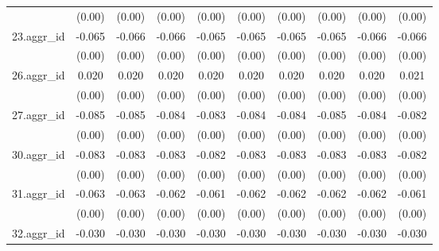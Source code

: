 {\begin{tabular}{l*{9}{c}}
          &   (0.00)         &   (0.00)         &   (0.00)         &   (0.00)         &   (0.00)         &   (0.00)         &   (0.00)         &   (0.00)         &   (0.00)         \\
[1em]
23.aggr\_id&   -0.065\sym{***}&   -0.066\sym{***}&   -0.066\sym{***}&   -0.065\sym{***}&   -0.065\sym{***}&   -0.065\sym{***}&   -0.065\sym{***}&   -0.066\sym{***}&   -0.066\sym{***}\\
          &   (0.00)         &   (0.00)         &   (0.00)         &   (0.00)         &   (0.00)         &   (0.00)         &   (0.00)         &   (0.00)         &   (0.00)         \\
[1em]
26.aggr\_id&    0.020\sym{***}&    0.020\sym{***}&    0.020\sym{***}&    0.020\sym{***}&    0.020\sym{***}&    0.020\sym{***}&    0.020\sym{***}&    0.020\sym{***}&    0.021\sym{***}\\
          &   (0.00)         &   (0.00)         &   (0.00)         &   (0.00)         &   (0.00)         &   (0.00)         &   (0.00)         &   (0.00)         &   (0.00)         \\
[1em]
27.aggr\_id&   -0.085\sym{***}&   -0.085\sym{***}&   -0.084\sym{***}&   -0.083\sym{***}&   -0.084\sym{***}&   -0.084\sym{***}&   -0.085\sym{***}&   -0.084\sym{***}&   -0.082\sym{***}\\
          &   (0.00)         &   (0.00)         &   (0.00)         &   (0.00)         &   (0.00)         &   (0.00)         &   (0.00)         &   (0.00)         &   (0.00)         \\
[1em]
30.aggr\_id&   -0.083\sym{***}&   -0.083\sym{***}&   -0.083\sym{***}&   -0.082\sym{***}&   -0.083\sym{***}&   -0.083\sym{***}&   -0.083\sym{***}&   -0.083\sym{***}&   -0.082\sym{***}\\
          &   (0.00)         &   (0.00)         &   (0.00)         &   (0.00)         &   (0.00)         &   (0.00)         &   (0.00)         &   (0.00)         &   (0.00)         \\
[1em]
31.aggr\_id&   -0.063\sym{***}&   -0.063\sym{***}&   -0.062\sym{***}&   -0.061\sym{***}&   -0.062\sym{***}&   -0.062\sym{***}&   -0.062\sym{***}&   -0.062\sym{***}&   -0.061\sym{***}\\
          &   (0.00)         &   (0.00)         &   (0.00)         &   (0.00)         &   (0.00)         &   (0.00)         &   (0.00)         &   (0.00)         &   (0.00)         \\
[1em]
32.aggr\_id&   -0.030\sym{***}&   -0.030\sym{***}&   -0.030\sym{***}&   -0.030\sym{***}&   -0.030\sym{***}&   -0.030\sym{***}&   -0.030\sym{***}&   -0.030\sym{***}&   -0.030\sym{***}\\

\end{tabular}}
